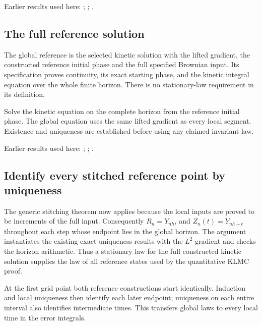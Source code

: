 \documentclass[11pt,a4paper]{report}
\begin{document}
Earlier results used here: \cite[Section~3.17.1]{LangevinLean2026ULASC}; \cite[Section~3.8.2]{LangevinLean2026ULASC}; \cite[Section~3.8.9]{LangevinLean2026ULASC}.
\subsection{\texorpdfstring{The full reference solution}{The full reference solution}}
\label{report-step-KineticLangevin-GenericCanonicalKLMC-lean-9}


The global reference is the selected kinetic solution with the lifted gradient, the constructed reference initial phase and the full specified Brownian input. Its specification proves continuity, its exact starting phase, and the kinetic integral equation over the whole finite horizon. There is no stationary-law requirement in its definition.



Solve the kinetic equation on the complete horizon from the reference initial phase. The global equation uses the same lifted gradient as every local segment. Existence and uniqueness are established before using any claimed invariant law.



Earlier results used here: \cite[Section~3.13.2]{LangevinLean2026ULASC}; \cite[Section~3.13.5]{LangevinLean2026ULASC}; \cite[Section~3.17.1]{LangevinLean2026ULASC}.
\subsection{\texorpdfstring{Identify every stitched reference point by uniqueness}{Identify every stitched reference point by uniqueness}}
\label{report-step-KineticLangevin-GenericCanonicalKLMC-lean-10}


The generic stitching theorem now applies because the local inputs are proved to be increments of the full input. Consequently \(R_n=Y_{nh}\), and \(Z_n(t)=Y_{nh+t}\) throughout each step whose endpoint lies in the global horizon. The argument instantiates the existing exact uniqueness results with the \(L^{2}\) gradient and checks the horizon arithmetic. Thus a stationary law for the full constructed kinetic solution supplies the law of all reference states used by the quantitative KLMC proof.



At the first grid point both reference constructions start identically. Induction and local uniqueness then identify each later endpoint; uniqueness on each entire interval also identifies intermediate times. This transfers global laws to every local time in the error integrals.
\end{document}
